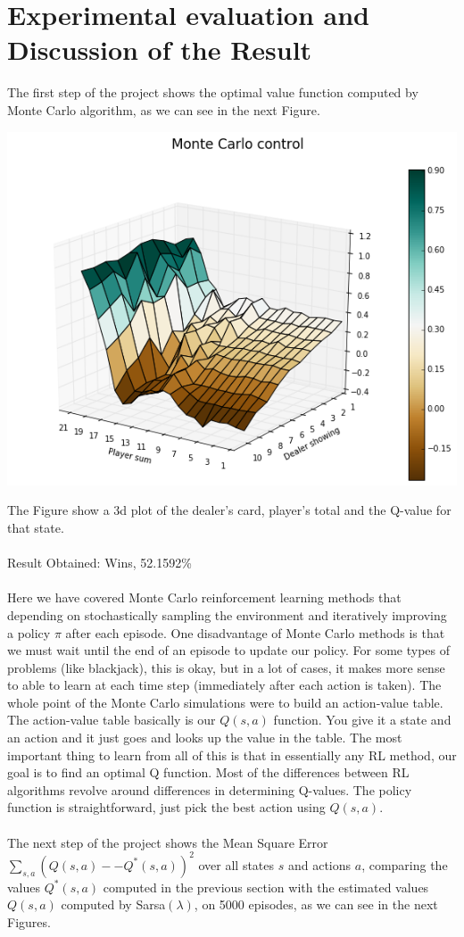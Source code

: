 \documentclass[11pt]{article}
\theoremstyle{plain}
\theoremstyle{definition}
\begin{document}
\section{Experimental evaluation and Discussion of the Result}
The first step of the project shows the optimal value function computed by Monte Carlo algorithm, as we can see in the next Figure.
\begin{center}
\includegraphics[scale=0.7]{MC}
\end{center}
The Figure show a 3d plot of the dealer's card, player's total and the Q-value for that state.
\\
\\
Result Obtained: Wins, 52.1592\%
\\
\\
Here we have covered Monte Carlo reinforcement learning methods that depending on stochastically sampling the environment and iteratively improving a policy $\pi$ after each episode. One disadvantage of Monte Carlo methods is that we must wait until the end of an episode to update our policy. For some types of problems (like blackjack), this is okay, but in a lot of cases, it makes more sense to able to learn at each time step (immediately after each action is taken).
The whole point of the Monte Carlo simulations were to build an action-value table. The action-value table basically is our  $Q(s,a)$ function. You give it a state and an action and it just goes and looks up the value in the table. The most important thing to learn from all of this is that in essentially any RL method, our goal is to find an optimal Q function. Most of the differences between RL algorithms revolve around differences in determining Q-values. The policy function is straightforward, just pick the best action using $Q(s,a)$.
\\
\\
The next step of the project shows the Mean Square Error $\sum_{s,a}(Q(s, a) −- Q^*(s, a))^2$ over all states $s$ and actions $a$, comparing the values $Q^*(s,a)$ computed in the previous section with the estimated values $Q(s, a)$ computed by Sarsa$(\lambda)$, on 5000 episodes, as we can see in the next Figures.
\end{document}
